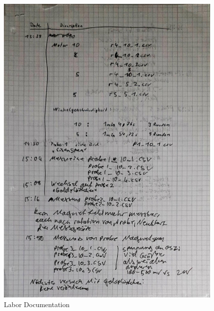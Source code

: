 \documentclass[30pt,a4paper]{article}
\begin{document}
	\begin{figure}[ht]
		\includegraphics[scale=0.3]{Bild/SQUID_(1)}
		\centering
		\caption{Labor Documentation}
	\end{figure}
\end{document}
